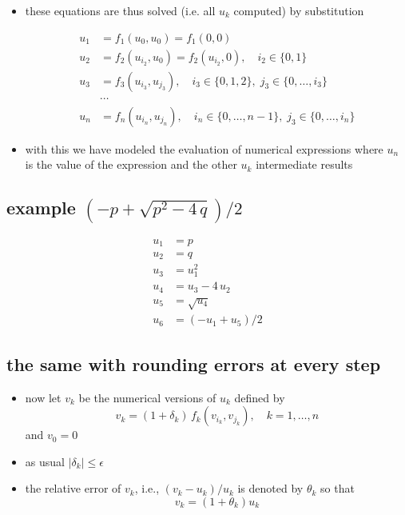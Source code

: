 \documentclass[11pt]{article}
\providecommand{\tightlist}{%
      \setlength{\itemsep}{0pt}\setlength{\parskip}{0pt}}
\begin{document}
\begin{itemize}
\tightlist
\item
  these equations are thus solved (i.e. all \(u_k\) computed) by
  substitution

  \begin{align*}
    u_1 &= f_1(u_0,u_0) = f_1(0,0) \\
    u_2 &= f_2(u_{i_2},u_0) = f_2(u_{i_2},0), \quad i_2\in \{0,1\}\\
    u_3 &= f_3(u_{i_3},u_{j_3}), \quad i_3 \in \{0,1,2\}, \; j_3 \in \{0,\ldots,i_3\}\\
    & \cdots \\
    u_n &= f_n(u_{i_n},u_{j_n}), \quad i_n \in \{0,\ldots,n-1\}, \; j_3 \in \{0,\ldots,i_n\}
  \end{align*}
\item
  with this we have modeled the evaluation of numerical expressions
  where \(u_n\) is the value of the expression and the other \(u_k\)
  intermediate results
\end{itemize}

\subsection{\texorpdfstring{example
\(\left(-p+\sqrt{p^2-4\,q}\right)/2\)}{example \textbackslash{}left(-p+\textbackslash{}sqrt\{p\^{}2-4\textbackslash{},q\}\textbackslash{}right)/2}}\label{example-left-psqrtp2-4qright2}

\begin{align*}
u_1 &= p \\
u_2 &= q \\
u_3 &= u_1^2 \\
u_4 &= u_3 - 4\, u_2 \\
u_5 &= \sqrt{u_4} \\
u_6 &= \left(-u_1+u_5\right)/2
\end{align*}

\subsection{the same with rounding errors at every
step}\label{the-same-with-rounding-errors-at-every-step}

\begin{itemize}
\tightlist
\item
  now let \(v_k\) be the numerical versions of \(u_k\) defined by
  \[v_k = (1+\delta_k)\,f_k(v_{i_k},v_{j_k}), \quad k=1,\ldots,n\] and
  \(v_0 = 0\)
\item
  as usual \(|\delta_k| \leq \epsilon\)
\item
  the relative error of \(v_k\), i.e., \((v_k-u_k)/u_k\) is denoted by
  \(\theta_k\) so that \[v_k = (1+\theta_k) u_k\]
\end{itemize}
\end{document}
